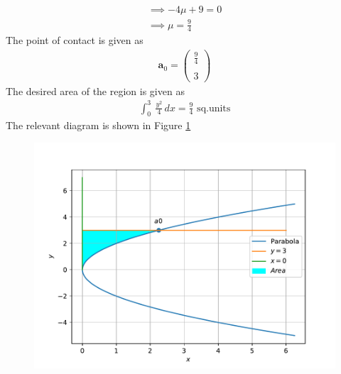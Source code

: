 \documentclass[12pt]{article}
\newcommand{\myvec}[1]{\ensuremath{\begin{pmatrix}#1\end{pmatrix}}}
\let\vec\mathbf
\begin{document}
\begin{enumerate}
\begin{multline}
	\implies -4\mu + 9 = 0  \\
	\implies \mu  = \frac{9}{4} 
\end{multline}
The point of contact is given as
\begin{align}
	\vec{a}_0 = \myvec{\frac{9}{4}  \\[1pt] \\ 3}
\end{align}
The desired area of the region is given as
\begin{align}
	\int_{0}^{3} \ \frac{y^2}{4} \,dx
	= \frac{9}{4} \text{ sq.units}
\end{align}
The relevant diagram is shown in Figure \ref{fig:Fig1}
\begin{figure}[!h]
	\begin{center}
		\includegraphics[width=\columnwidth]{figs/problem13.pdf}
	\end{center}
\caption{}
\label{fig:Fig1}
\end{figure}
\end{enumerate}
\end{document}
